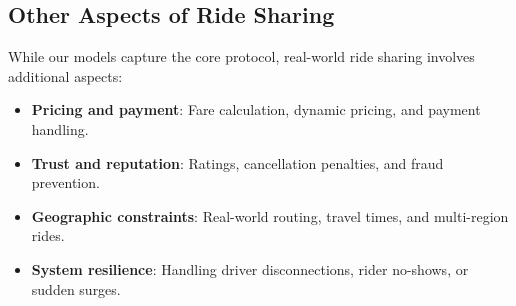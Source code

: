 \documentclass[11pt]{article}
\begin{document}

\subsection{Other Aspects of Ride Sharing}

While our models capture the core protocol, real-world ride sharing involves additional aspects:
\begin{itemize}[leftmargin=1.5em]
  \item \textbf{Pricing and payment}: Fare calculation, dynamic pricing, and payment handling.
  \item \textbf{Trust and reputation}: Ratings, cancellation penalties, and fraud prevention.
  \item \textbf{Geographic constraints}: Real-world routing, travel times, and multi-region rides.
  \item \textbf{System resilience}: Handling driver disconnections, rider no-shows, or sudden surges.
\end{itemize}
\end{document}
